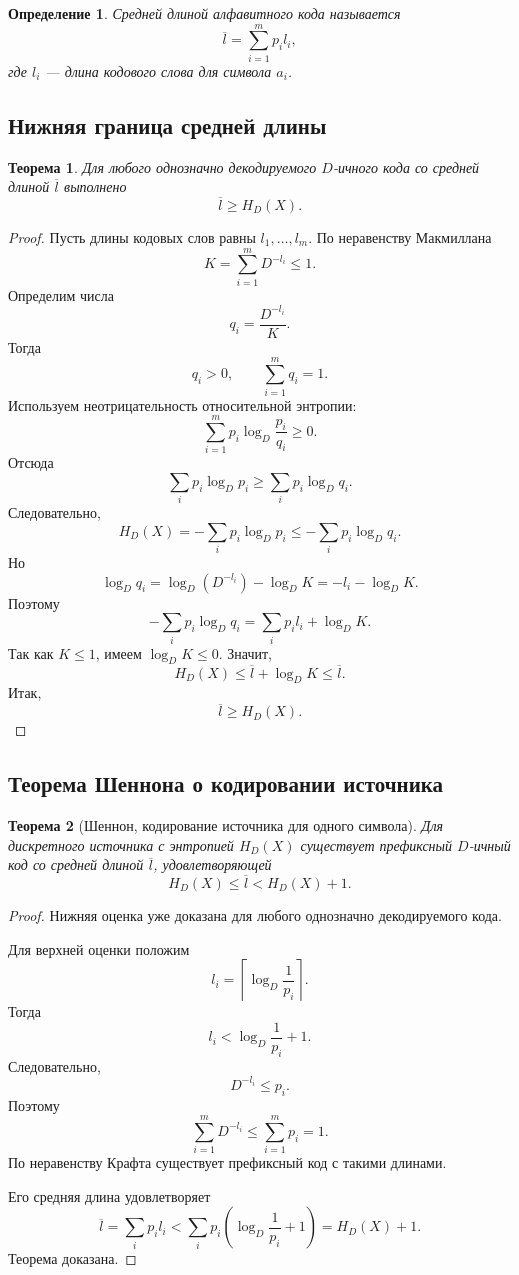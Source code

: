 \documentclass[12pt,a4paper]{article}
\newtheorem{definition}{Определение}[section]
\newtheorem{theorem}{Теорема}[section]
\begin{document}
\begin{definition}
Средней длиной алфавитного кода называется
\[
    \overline{l}
    =
    \sum_{i=1}^{m}p_i l_i,
\]
где $l_i$ --- длина кодового слова для символа $a_i$.
\end{definition}

\subsection{Нижняя граница средней длины}

\begin{theorem}
Для любого однозначно декодируемого $D$-ичного кода со средней длиной $\overline l$ выполнено
\[
    \overline l \ge H_D(X).
\]
\end{theorem}

\begin{proof}
Пусть длины кодовых слов равны $l_1,\dots,l_m$.
По неравенству Макмиллана
\[
    K=\sum_{i=1}^{m}D^{-l_i}\le 1.
\]
Определим числа
\[
    q_i=\frac{D^{-l_i}}{K}.
\]
Тогда
\[
    q_i>0,\qquad \sum_{i=1}^{m}q_i=1.
\]
Используем неотрицательность относительной энтропии:
\[
    \sum_{i=1}^{m}p_i\log_D\frac{p_i}{q_i}\ge 0.
\]
Отсюда
\[
    \sum_i p_i\log_D p_i
    \ge
    \sum_i p_i\log_D q_i.
\]
Следовательно,
\[
    H_D(X)
    =
    -\sum_i p_i\log_D p_i
    \le
    -\sum_i p_i\log_D q_i.
\]
Но
\[
    \log_D q_i
    =
    \log_D(D^{-l_i})-\log_D K
    =
    -l_i-\log_D K.
\]
Поэтому
\[
    -\sum_i p_i\log_D q_i
    =
    \sum_i p_i l_i+\log_D K.
\]
Так как $K\le 1$, имеем $\log_D K\le 0$.
Значит,
\[
    H_D(X)
    \le
    \overline l+\log_D K
    \le
    \overline l.
\]
Итак,
\[
    \overline l\ge H_D(X).
\]
\end{proof}

\subsection{Теорема Шеннона о кодировании источника}

\begin{theorem}[Шеннон, кодирование источника для одного символа]
Для дискретного источника с энтропией $H_D(X)$ существует префиксный $D$-ичный код со средней длиной $\overline l$, удовлетворяющей
\[
    H_D(X)\le \overline l < H_D(X)+1.
\]
\end{theorem}

\begin{proof}
Нижняя оценка уже доказана для любого однозначно декодируемого кода.

Для верхней оценки положим
\[
    l_i=\left\lceil \log_D\frac1{p_i}\right\rceil.
\]
Тогда
\[
    l_i < \log_D\frac1{p_i}+1.
\]
Следовательно,
\[
    D^{-l_i}\le p_i.
\]
Поэтому
\[
    \sum_{i=1}^{m}D^{-l_i}\le \sum_{i=1}^{m}p_i=1.
\]
По неравенству Крафта существует префиксный код с такими длинами.

Его средняя длина удовлетворяет
\[
    \overline l
    =
    \sum_i p_i l_i
    <
    \sum_i p_i\left(\log_D\frac1{p_i}+1\right)
    =
    H_D(X)+1.
\]
Теорема доказана.
\end{proof}
\end{document}
